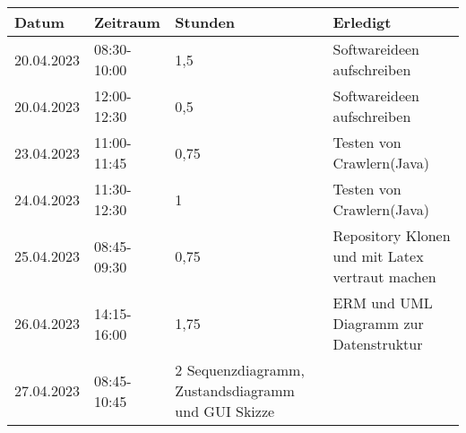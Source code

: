 \begin{tabular}{|l|l|l|l|}
\hline
Datum & Zeitraum & Stunden & Erledigt \\
\hline
    20.04.2023 & 08:30-10:00 & 1,5 & Softwareideen aufschreiben\\
    20.04.2023 & 12:00-12:30 & 0,5 & Softwareideen aufschreiben\\
    23.04.2023 & 11:00-11:45 & 0,75 & Testen von Crawlern(Java)\\
    24.04.2023 & 11:30-12:30 & 1 & Testen von Crawlern(Java)\\
    25.04.2023 & 08:45-09:30 & 0,75 & Repository Klonen und mit Latex vertraut machen\\
    26.04.2023 & 14:15-16:00 & 1,75 & ERM und UML Diagramm zur Datenstruktur\\
    27.04.2023 & 08:45-10:45 & 2 Sequenzdiagramm, Zustandsdiagramm und GUI Skizze\\


\hline
\end{tabular}